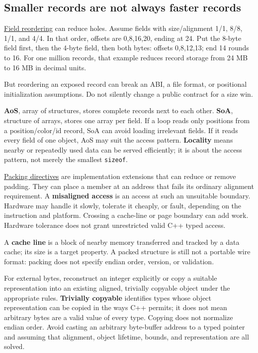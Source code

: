 \subsection{Smaller records are not always faster records}\label{05-engine-i-ch002-smaller-records-are-not-always-faster-records}

\hyperref[appendix-5522ad176ca0]{Field reordering} can reduce holes. Assume fields with size/alignment 1/1, 8/8, 1/1, and 4/4. In that order, offsets are 0,8,16,20, ending at 24. Put the 8-byte field first, then the 4-byte field, then both bytes: offsets 0,8,12,13; end 14 rounds to 16. For one million records, that example reduces record storage from 24 MB to 16 MB in decimal units.

But reordering an exposed record can break an ABI, a file format, or positional initialization assumptions. Do not silently change a public contract for a size win.

\textbf{AoS}, array of structures, stores complete records next to each other. \textbf{SoA}, structure of arrays, stores one array per field. If a loop reads only positions from a position/color/id record, SoA can avoid loading irrelevant fields. If it reads every field of one object, AoS may suit the access pattern. \textbf{Locality} means nearby or repeatedly used data can be served efficiently; it is about the access pattern, not merely the smallest \texttt{sizeof}.

\hyperref[appendix-0682dbfc5f0e]{Packing directives} are implementation extensions that can reduce or remove padding. They can place a member at an address that fails its ordinary alignment requirement. A \textbf{misaligned access} is an access at such an unsuitable boundary. Hardware may handle it slowly, tolerate it cheaply, or fault, depending on the instruction and platform. Crossing a cache-line or page boundary can add work. Hardware tolerance does not grant unrestricted valid C++ typed access.

A \textbf{cache line} is a block of nearby memory transferred and tracked by a data cache; its size is a target property. A packed structure is still not a portable wire format: packing does not specify endian order, version, or validation.

For external bytes, reconstruct an integer explicitly or copy a suitable representation into an existing aligned, trivially copyable object under the appropriate rules. \textbf{Trivially copyable} identifies types whose object representation can be copied in the ways C++ permits; it does not mean arbitrary bytes are a valid value of every type. Copying does not normalize endian order. Avoid casting an arbitrary byte-buffer address to a typed pointer and assuming that alignment, object lifetime, bounds, and representation are all solved.

